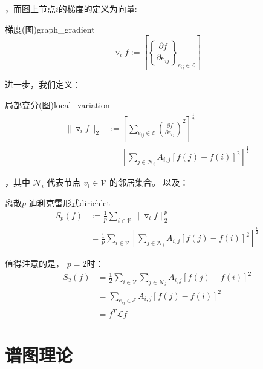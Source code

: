 \documentclass[color=gray,base=hide,cn]{elegantbook}
\begin{document}
，而图上节点$i$的梯度的定义为向量:

\begin{definition}{梯度(图)}{graph_gradient}
    \begin{equation}
\triangledown_i f := \left[\left\{\frac{\partial f }{\partial e_{ij} } \right\}_{e_{ij} \in \mathcal{E}}\right]
    \end{equation}
\end{definition}

进一步，我们定义：
\begin{definition}{局部变分(图)}{local_variation}
    \begin{equation}
        \begin{aligned}
            \| \triangledown_i f \|_2 &:=\left[\sum_{e_{ij} \in \mathcal{E}} \left(\frac{\partial f }{\partial e_{ij} }\right)^2\right]^{\frac{1}{2}} \\
            &~=\left[\sum_{j \in \mathcal{N}_i}A_{i,j}\left[f(j)-f(i)\right]^2\right]^{\frac{1}{2}}
        \end{aligned}
    \end{equation}
\end{definition}
，其中 $\mathcal{N}_i$ 代表节点 $v_i \in \mathcal{V}$ 的邻居集合。
以及：
\begin{definition}{离散$p$-迪利克雷形式}{dirichlet}
    \begin{equation}
        \begin{aligned}
            S_p(f) & :=\frac{1}{p}\sum_{i \in \mathcal{V}}\| \triangledown_i f \|_2^p \\
            & =\frac{1}{p}\sum_{i \in \mathcal{V}}\left[\sum_{j \in \mathcal{N}_i}A_{i,j}\left[f(j)-f(i)\right]^2\right]^{\frac{p}{2}}
        \end{aligned}
    \end{equation}
\end{definition}

值得注意的是， $p=2$时：
\begin{equation}
    \begin{aligned}
        S_2(f) & = \frac{1}{2}\sum_{i \in \mathcal{V}}\sum_{j \in \mathcal{N}_i}A_{i,j}\left[f(j)-f(i)\right]^2 \\
        & = \sum_{e_{ij} \in \mathcal{E}}A_{i,j}\left[f(j)-f(i)\right]^2 \\
        & =f^T\mathcal{L} f
    \end{aligned}
\end{equation}


\section{谱图理论}
\end{document}
